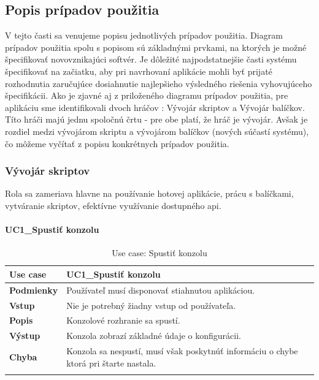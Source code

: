 \subsection{Popis prípadov použitia}
\indent V tejto časti sa venujeme popisu jednotlivých prípadov použitia. Diagram prípadov použitia spolu s popisom sú základnými prvkami, na ktorých je možné špecifikovať novovznikajúci softvér. Je dôležité najpodstatnejšie časti systému špecifikovať na začiatku, aby pri navrhovaní aplikácie mohli byť prijaté rozhodnutia zaručujúce dosiahnutie najlepšieho výsledného riešenia vyhovujúceho špecifikácii. Ako je zjavné aj z priloženého diagramu prípadov použitia, pre aplikáciu sme identifikovali dvoch hráčov : Vývojár skriptov a Vývojár balíčkov. Títo hráči majú jednu spoločnú črtu - pre obe platí, že hráč je vývojár. Avšak je rozdiel medzi vývojárom skriptu a vývojárom balíčkov (nových súčastí systému), čo môžeme vyčítať z popisu konkrétnych prípadov použitia.
\subsubsection{Vývojár skriptov}
\indent Rola sa zameriava hlavne na používanie hotovej aplikácie, prácu s balíčkami, vytváranie skriptov, efektívne využívanie dostupného \acrshort{api}. 
\paragraph{UC1\_Spustiť konzolu}
\begin{center}
	\begin{longtable}{|p{2.5cm}|p{12.2cm}|}
		\hline
		\textbf{Use case} & UC1\_Spustiť konzolu \\ 
		\hline
		\textbf{Podmienky} & Používateľ musí disponovať stiahnutou aplikáciou.\\
		\hline
		\textbf{Vstup} & Nie je potrebný žiadny vstup od používateľa.\\
		\hline
		\textbf{Popis} & Konzolové rozhranie sa spustí. \\ 
		\hline
		\textbf{Výstup} & Konzola zobrazí základné údaje o konfigurácii.\\
		\hline
		\textbf{Chyba} & Konzola sa nespustí, musí však poskytnúť informáciu o chybe ktorá pri štarte nastala.\\
		\hline
	\caption{Use case: Spustiť konzolu}
	\label{table:1}
	\end{longtable}
\end{center}


